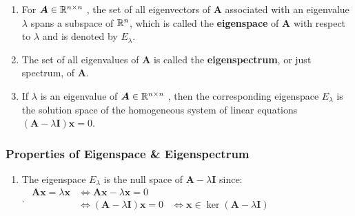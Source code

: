 \begin{enumerate}
    \item
    \begin{definition}[Eigenspace]
        For $\bm{A} \in \mathbb{R}^{n\times n}$ , the set of all eigenvectors of $\bm{A}$ associated with an eigenvalue $\lambda $ spans a subspace of $\mathbb{R}^n$, which is called the \textbf{eigenspace} of $\bm{A}$ with respect to $\lambda $ and is denoted by $E_\lambda $.
        \hfill \cite{mfml/book/mml/Deisenroth-Faisal-Ong}
    \end{definition}

    \item
    \begin{definition}[Eigenspectrum]
        The set of all eigenvalues of $\bm{A}$ is called the \textbf{eigenspectrum}, or just spectrum, of $\bm{A}$.
        \hfill \cite{mfml/book/mml/Deisenroth-Faisal-Ong}
    \end{definition}

    \item If $\lambda $ is an eigenvalue of $\bm{A} \in \mathbb{R}^{n\times n}$ , then the corresponding eigenspace $E_\lambda $ is the solution space of the homogeneous system of linear equations $(\bm{A} - \lambda \bm{I})\bm{x} = 0$.
    \hfill \cite{mfml/book/mml/Deisenroth-Faisal-Ong}
\end{enumerate}


\subsubsection{Properties of Eigenspace \& Eigenspectrum}

\begin{enumerate}
    \item The eigenspace $E_\lambda$  is the null space of $\bm{A} - \lambda \bm{I}$ since:
    \hfill \cite{mfml/book/mml/Deisenroth-Faisal-Ong}
    \\
    .\hfill
    $
        \begin{aligned}
            \bm{Ax} = \lambda \bm{x}
            & \Longleftrightarrow \bm{Ax} - \lambda \bm{x} = 0 \\
            & \Longleftrightarrow (\bm{A} - \lambda \bm{I})\bm{x} = 0
            & \Longleftrightarrow \bm{x} \in \ker(\bm{A} - \lambda \bm{I})
        \end{aligned}
    $
    \hfill \cite{mfml/book/mml/Deisenroth-Faisal-Ong}
\end{enumerate}






